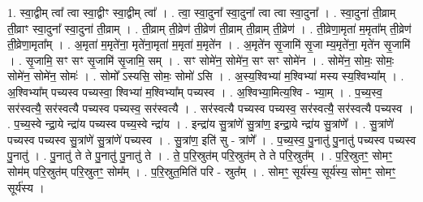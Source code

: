 \documentclass[17pt]{extarticle}
\begin{document}
1. स्वा॒द्वीम् त्वा᳚ त्वा स्वा॒द्वीꣳ स्वा॒द्वीम् त्वा᳚ । . त्वा॒ स्वा॒दुना᳚ स्वा॒दुना᳚ त्वा त्वा स्वा॒दुना᳚ । . स्वा॒दुना॑ ती॒व्राम् ती॒व्राꣳ स्वा॒दुना᳚ स्वा॒दुना॑ ती॒व्राम् । . ती॒व्राम् ती॒व्रेण॑ ती॒व्रेण॑ ती॒व्राम् ती॒व्राम् ती॒व्रेण॑ । . ती॒व्रेणा॒मृता॑ म॒मृता᳚म् ती॒व्रेण॑ ती॒व्रेणा॒मृता᳚म् । . अ॒मृता॑ म॒मृते॑ना॒ मृते॑ना॒मृता॑ म॒मृता॑ म॒मृते॑न । . अ॒मृते॑न सृ॒जामि॑ सृ॒जा म्य॒मृते॑ना॒ मृते॑न सृ॒जामि॑ । . सृ॒जामि॒ सꣳ सꣳ सृ॒जामि॑ सृ॒जामि॒ सम् । . सꣳ सोमे॑न॒ सोमे॑न॒ सꣳ सꣳ सोमे॑न । . सोमे॑न॒ सोमः॒ सोमः॒ सोमे॑न॒ सोमे॑न॒ सोमः॑ । . सोमो᳚ ऽस्यसि॒ सोमः॒ सोमो॑ ऽसि । . अ॒स्य॒श्विभ्या॑ म॒श्विभ्या॑ मस्य स्य॒श्विभ्या᳚म् । . अ॒श्विभ्या᳚म् पच्यस्व पच्यस्वा॒ श्विभ्या॑ म॒श्विभ्या᳚म् पच्यस्व । . अ॒श्विभ्या॒मित्य॒श्वि - भ्या॒म् । . प॒च्य॒स्व॒ सर॑स्वत्यै॒ सर॑स्वत्यै पच्यस्व पच्यस्व॒ सर॑स्वत्यै । . सर॑स्वत्यै पच्यस्व पच्यस्व॒ सर॑स्वत्यै॒ सर॑स्वत्यै पच्यस्व । . प॒च्य॒स्वे न्द्रा॒ये न्द्रा॑य पच्यस्व पच्य॒स्वे न्द्रा॑य । . इन्द्रा॑य सु॒त्रांणे॑ सु॒त्रांण॒ इन्द्रा॒ये न्द्रा॑य सु॒त्रांणे᳚ । . सु॒त्रांणे॑ पच्यस्व पच्यस्व सु॒त्रांणे॑ सु॒त्रांणे॑ पच्यस्व । . सु॒त्रांण॒ इति॑ सु - त्रांणे᳚ । . प॒च्य॒स्व॒ पु॒नातु॑ पु॒नातु॑ पच्यस्व पच्यस्व पु॒नातु॑ । . पु॒नातु॑ ते ते पु॒नातु॑ पु॒नातु॑ ते । . ते॒ प॒रि॒स्रुत॑म् परि॒स्रुत॑म् ते ते परि॒स्रुत᳚म् । . प॒रि॒स्रुतꣳ॒॒ सोमꣳ॒॒ सोम॑म् परि॒स्रुत॑म् परि॒स्रुतꣳ॒॒ सोम᳚म् । . प॒रि॒स्रुत॒मिति॑ परि - स्रुत᳚म् । . सोमꣳ॒॒ सूर्य॑स्य॒ सूर्य॑स्य॒ सोमꣳ॒॒ सोमꣳ॒॒ सूर्य॑स्य । \newline
\end{document}
